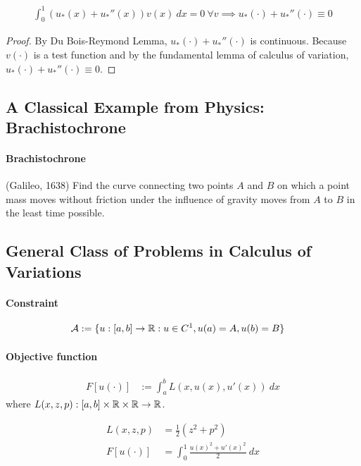 \documentclass{article}
\begin{document}
	\begin{proposition}
		\begin{align}
			\int_0^1 (u_*(x) + u_*''(x))v(x)\ dx = 0\ \forall v \implies u_*(\cdot) + u_*''(\cdot) \equiv 0
		\end{align}
	\end{proposition}
	
	\begin{proof}
		By Du Bois-Reymond Lemma, $u_*(\cdot) + u_*''(\cdot)$ is continuous. Because $v(\cdot)$ is a test function and by the fundamental lemma of calculus of variation, $u_*(\cdot) + u_*''(\cdot) \equiv 0$.
	\end{proof}
	
	\subsection{A Classical Example from Physics: Brachistochrone}
	\paragraph{Brachistochrone}(Galileo, 1638) Find the curve connecting two points $A$ and $B$ on which a point mass moves without friction under the influence of gravity moves from $A$ to $B$ in the least time possible.
	
	\subsection{General Class of Problems in Calculus of Variations}
	\paragraph{Constraint}
	\begin{align}
		\mathcal{{A}} &:=\{
		u:[a, b] \to \mathbb{R}:
		u \in C^1, u(a) = A, u(b) = B
		\}
	\end{align}
	\paragraph{Objective function}
	\begin{align}
		F[u(\cdot)] &:= \int_a^b L(x, u(x), u'(x))\ dx
	\end{align}
	where $L(x, z, p): [a, b] \times \mathbb{R} \times \mathbb{R} \to \mathbb{R}$.
	
	\begin{example}
		\begin{align}
			L(x, z, p) &= \frac{1}{2}(z^2 + p^2) \\
			F[u(\cdot)] &= \int_0^1 \frac{u(x)^2 + u'(x)^2}{2}\ dx
		\end{align}
	\end{example}
	
\end{document}
